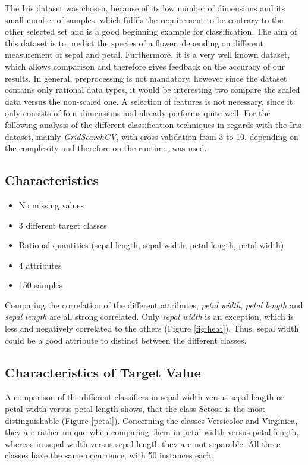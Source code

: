 The Iris dataset was chosen, because of its low number of dimensions and its small number of samples, which fulfils the requirement to be contrary to the other selected set and is a good beginning example for classification. The aim of this dataset is to predict the species of a flower, depending on different measurement of sepal and petal. Furthermore, it is a very well known dataset, which allows comparison and therefore gives feedback on the accuracy of our results. In general, preprocessing is not mandatory, however since the dataset contains only rational data types, it would be interesting two compare the scaled data versus the non-scaled one. A selection of features is not necessary, since it only consists of four dimensions and already performs quite well. For the following analysis of the different classification techniques in regards with the Iris dataset, mainly \textit{GridSearchCV}, with cross validation from 3 to 10, depending on the complexity and therefore on the runtime, was used. 

\subsection{Characteristics}

\begin{itemize}
\item No missing values
\item 3 different target classes
\item Rational quantities (sepal length, sepal width, petal length, petal width)
\item 4 attributes
\item 150 samples
\end{itemize}

Comparing the correlation of the different attributes, \textit{petal width}, \textit{petal length} and \textit{sepal length} are all strong correlated. Only \textit{sepal width} is an exception, which is less and negatively correlated to the others (Figure \ref{fig:heat}). Thus, sepal width could be a good attribute to distinct between the different classes.


\subsection{Characteristics of Target Value}
A comparison of the different classifiers in sepal width versus sepal length or petal width versus petal length shows, that the class Setosa is the most distinguishable (Figure \ref{petal}). Concerning the classes Versicolor and Virginica, they are rather unique when comparing them in petal width versus petal length, whereas in sepal width versus sepal length they are not separable. All three classes have the same occurrence, with 50 instances each.

